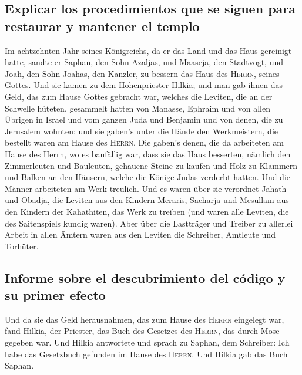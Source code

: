 \hypertarget{explicar-los-procedimientos-que-se-siguen-para-restaurar-y-mantener-el-templo}{%
\subsection{Explicar los procedimientos que se siguen para restaurar y
mantener el
templo}\label{explicar-los-procedimientos-que-se-siguen-para-restaurar-y-mantener-el-templo}}

 Im achtzehnten Jahr seines Königreichs, da er das Land
und das Haus gereinigt hatte, sandte er Saphan, den Sohn Azaljas, und
Maaseja, den Stadtvogt, und Joah, den Sohn Joahas, den Kanzler, zu
bessern das Haus des \textsc{Herrn}, seines Gottes.  Und
sie kamen zu dem Hohenpriester Hilkia; und man gab ihnen das Geld, das
zum Hause Gottes gebracht war, welches die Leviten, die an der Schwelle
hüteten, gesammelt hatten von Manasse, Ephraim und von allen Übrigen in
Israel und vom ganzen Juda und Benjamin und von denen, die zu Jerusalem
wohnten;  und sie gaben's unter die Hände den
Werkmeistern, die bestellt waren am Hause des \textsc{Herrn}. Die
gaben's denen, die da arbeiteten am Hause des Herrn, wo es baufällig
war, dass sie das Haus besserten,  nämlich den
Zimmerleuten und Bauleuten, gehauene Steine zu kaufen und Holz zu
Klammern und Balken an den Häusern, welche die Könige Judas verderbt
hatten.  Und die Männer arbeiteten am Werk treulich. Und
es waren über sie verordnet Jahath und Obadja, die Leviten aus den
Kindern Meraris, Sacharja und Mesullam aus den Kindern der Kahathiten,
das Werk zu treiben (und waren alle Leviten, die des Saitenspiels kundig
waren).  Aber über die Lastträger und Treiber zu allerlei
Arbeit in allen Ämtern waren aus den Leviten die Schreiber, Amtleute und
Torhüter.

\hypertarget{informe-sobre-el-descubrimiento-del-cuxf3digo-y-su-primer-efecto}{%
\subsection{Informe sobre el descubrimiento del código y su primer
efecto}\label{informe-sobre-el-descubrimiento-del-cuxf3digo-y-su-primer-efecto}}

 Und da sie das Geld herausnahmen, das zum Hause des
\textsc{Herrn} eingelegt war, fand Hilkia, der Priester, das Buch des
Gesetzes des \textsc{Herrn}, das durch Mose gegeben war. 
Und Hilkia antwortete und sprach zu Saphan, dem Schreiber: Ich habe das
Gesetzbuch gefunden im Hause des \textsc{Herrn}. Und Hilkia gab das Buch
Saphan.

